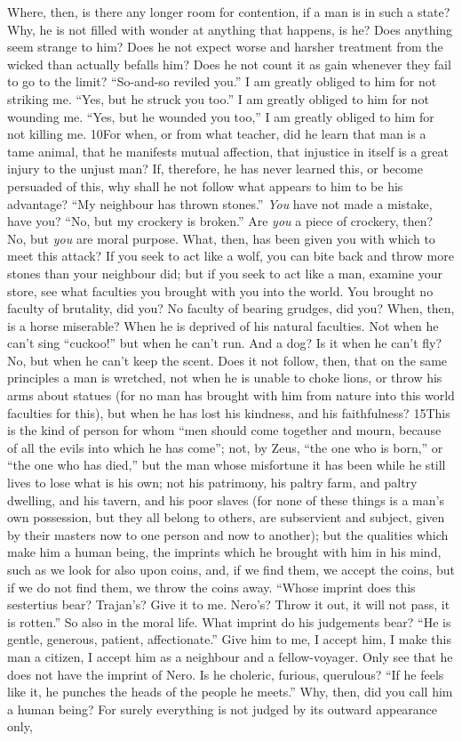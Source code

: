 Where, then, is there any longer room for contention, if a man is in such a state? Why, he is not filled with wonder at anything that happens, is he? Does anything seem strange to him? Does he not expect worse and harsher treatment from the wicked than actually befalls him? Does he not count it as gain whenever they fail to go to the limit? ``So-and-so reviled you.'' I am greatly obliged to him for not striking me. ``Yes, but he struck you too.'' I am greatly obliged to him for not wounding me. ``Yes, but he wounded you too,'' I am greatly obliged to him for not killing me. 10For when, or from what teacher, did he learn that man is a tame animal, that he manifests mutual affection, that injustice in itself is a great injury to the unjust man? If, therefore, he has never learned this, or become persuaded of this, why shall he not follow what appears to him to be his advantage? ``My neighbour has thrown stones.'' \emph{You} have not made a mistake, have you? ``No, but my crockery is broken.'' Are \emph{you} a piece of crockery, then? No, but \emph{you} are moral purpose. What, then, has been given you with which to meet this attack? If you seek to act like a wolf, you can bite back and throw more stones than your neighbour did; but if you seek to act like a man, examine your store, see what faculties you brought with you into the world. You brought no faculty of brutality, did you? No faculty of bearing grudges, did you? When, then, is a horse miserable? When he is deprived of his natural faculties. Not when he can't sing ``cuckoo!'' but when he can't run. And a dog? Is it when he can't fly? No, but when he can't keep the scent. Does it not follow, then, that on the same principles a man is wretched, not when he is unable to choke lions, or throw his arms about statues (for no man has brought with him from nature into this world faculties for this), but when he has lost his kindness, and his faithfulness? 15This is the kind of person for whom ``men should come together and mourn, because of all the evils into which he has come''; not, by Zeus, ``the one who is born,'' or ``the one who has died,'' but the man whose misfortune it has been while he still lives to lose what is his own; not his patrimony, his paltry farm, and paltry dwelling, and his tavern, and his poor slaves (for none of these things is a man's own possession, but they all belong to others, are subservient and subject, given by their masters now to one person and now to another); but the qualities which make him a human being, the imprints which he brought with him in his mind, such as we look for also upon coins, and, if we find them, we accept the coins, but if we do not find them, we throw the coins away. ``Whose imprint does this sestertius bear? Trajan's? Give it to me. Nero's? Throw it out, it will not pass, it is rotten.'' So also in the moral life. What imprint do his judgements bear? ``He is gentle, generous, patient, affectionate.'' Give him to me, I accept him, I make this man a citizen, I accept him as a neighbour and a fellow-voyager. Only see that he does not have the imprint of Nero. Is he choleric, furious, querulous? ``If he feels like it, he punches the heads of the people he meets.'' Why, then, did you call him a human being? For surely everything is not judged by its outward appearance only, 